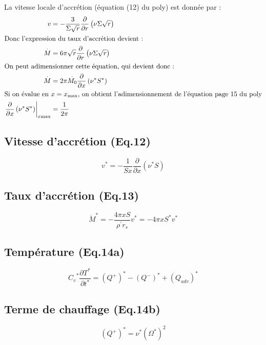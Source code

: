 \documentclass[a4paper,11pt]{article}
\begin{document}
La vitesse locale d'accrétion (équation (12) du poly) est donnée par :
\begin{align}
  v &= -\frac{3}{\Sigma\sqrt{r}}\frac{\partial}{\partial r}\left(\nu\Sigma\sqrt{r}\right)\\
  \intertext{Donc l'expression du taux d'accrétion devient :}
  \overset{.}{M} &= 6\pi\sqrt{r}\frac{\partial}{\partial r}\left(\nu\Sigma\sqrt{r}\right)\\
  \intertext{On peut adimensionner cette équation, qui devient donc :}
  \overset{.}{M} &= 2\pi\overset{.}{M_0}\frac{\partial}{\partial x}\left(\nu^{*} S^{*}\right)\\
  \intertext{Si on évalue en $x=x_\text{max}$, on obtient l'adimensionnement de l'équation page 15 du poly}
  \left.\frac{\partial}{\partial x}\left(\nu^{*} S^{*}\right)\right|_{x\text{max}} &= \frac{1}{ 2\pi}
\end{align}

\subsection{Vitesse d'accrétion (Eq.12)}
    \begin{equation}\label{vitesse_accretion}
        v^* = - \frac{1}{S x} \frac{\partial}{\partial x} (\nu^* S)
    \end{equation}
    
\subsection{Taux d'accrétion (Eq.13)}
    \begin{equation}\label{taux_accretion}
        \dot{M}^*=-\frac{4\pi xS}{\rho^{'}r_s}v^* = - 4 \pi x S^* v^*
    \end{equation}
    
\subsection{Température (Eq.14a)}
    \begin{equation}\label{temperature}
        {C_v}^*\frac{\partial T^*}{\partial t^*}=(Q^+)^*-(Q^-)^*+(Q_{adv})^*
    \end{equation}
    
\subsection{Terme de chauffage (Eq.14b)}
    \begin{equation}\label{terme_de_chauffage}
        (Q^{+})^* = \nu^* (\Omega^*)^2
    \end{equation}
    
\end{document}
